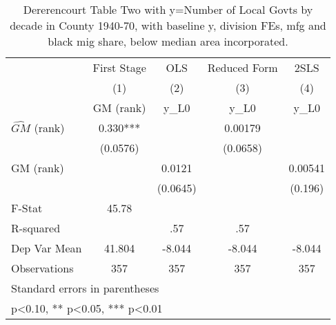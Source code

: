 \begin{table}[htbp]\centering
\def\sym#1{\ifmmode^{#1}\else\(^{#1}\)\fi}
\caption{Dererencourt Table Two with y=Number of Local Govts by decade in County 1940-70, with baseline y, division FEs, mfg and black mig share, below median area incorporated.}
\begin{tabular}{l*{4}{c}}
\toprule
                    & First Stage   &         OLS   &Reduced Form   &        2SLS   \\
                    &\multicolumn{1}{c}{(1)}&\multicolumn{1}{c}{(2)}&\multicolumn{1}{c}{(3)}&\multicolumn{1}{c}{(4)}\\
                    &\multicolumn{1}{c}{GM  (rank)}&\multicolumn{1}{c}{y\_L0}&\multicolumn{1}{c}{y\_L0}&\multicolumn{1}{c}{y\_L0}\\
\midrule
$\hat{GM}$ (rank)   &       0.330***&               &     0.00179   &               \\
                    &    (0.0576)   &               &    (0.0658)   &               \\
\addlinespace
GM  (rank)          &               &      0.0121   &               &     0.00541   \\
                    &               &    (0.0645)   &               &     (0.196)   \\
\midrule
F-Stat              &       45.78   &               &               &               \\
R-squared           &               &         .57   &         .57   &               \\
Dep Var Mean        &      41.804   &      -8.044   &      -8.044   &      -8.044   \\
Observations        &         357   &         357   &         357   &         357   \\
\bottomrule
\multicolumn{5}{l}{\footnotesize Standard errors in parentheses}\\
\multicolumn{5}{l}{\footnotesize * p<0.10, ** p<0.05, *** p<0.01}\\
\end{tabular}
\end{table}
